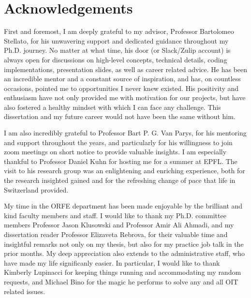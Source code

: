 \documentclass[12pt]{report}
\begin{document}
\newpage
\titlespacing*{\chapter}{0pt}{0em}{1.5em}
\chapter*{Acknowledgements}
First and foremost, I am deeply grateful to my advisor, Professor Bartolomeo Stellato, for his unwavering support and dedicated guidance throughout my Ph.D. journey. 
No matter at what time, his door (or Slack/Zulip account) is always open for discussions on high-level concepts, technical details, coding implementations, presentation slides, as well as career related advice. 
He has been an incredible mentor and a constant source of inspiration, and has, on countless occasions, pointed me to opportunities I never knew existed. 
His positivity and enthusiasm have not only provided me with motivation for our projects, but have also fostered a healthy mindset with which I can face any challenge. 
This dissertation and my future career would not have been the same without him. 


I am also incredibly grateful to Professor Bart P. G. Van Parys, for his mentoring and support throughout the years, and particularly for his willingness to join zoom meetings on short notice to provide valuable insights. 
I am especially thankful to Professor Daniel Kuhn for hosting me for a summer at EPFL. The visit to his research group was an enlightening and enriching experience, both for the research insighted gained and for the refreshing change of pace that life in Switzerland provided. 


My time in the ORFE department has been made enjoyable by the brilliant and kind faculty members and staff. I would like to thank my Ph.D. committee members Professor Jason Klusowski and Professor Amir Ali Ahmadi, and my dissertation reader Professor Elizaveta Rebrova, for their valuable time and insightful remarks not only on my thesis, but also for my practice job talk in the prior months. My deep appreciation also extends to the administrative staff, who have made my life significanly easier. 
In particular, I would like to thank Kimberly Lupinacci for keeping things running and accommodating my random requests, and Michael Bino for the magic he performs to solve any and all OIT related issues.
\end{document}
